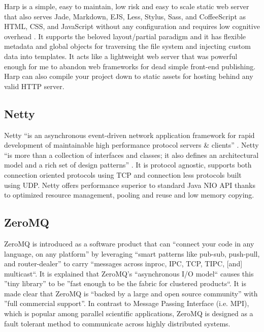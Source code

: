      Harp is a simple, easy to maintain, low risk and
     easy to scale static web server that also serves Jade, Markdown,
     EJS, Less, Stylus, Sass, and CoffeeScript as HTML, CSS, and
     JavaScript without any configuration and requires low cognitive
     overhead \cite{www-harp}. It supports the beloved layout/partial paradigm and it
     has flexible metadata and global objects for traversing the file
     system and injecting custom data into templates. It acts like a
     lightweight web server that was powerful enough for me to abandon
     web frameworks for dead simple front-end publishing. Harp can
     also compile your project down to static assets for hosting
     behind any valid HTTP server.

     \pv
     
\subsection{Netty}

     Netty ``is an asynchronous event-driven network
     application framework for rapid development of maintainable high
     performance protocol servers \& clients'' \cite{www-netty}. Netty
     ``is more than a collection of interfaces and classes; it also
     defines an architectural model and a rich set of design
     patterns'' \cite{netty-book}. It is protocol agnostic, supports both connection
     oriented protocols using TCP and connection less protocols built
     using UDP. Netty offers performance superior to standard Java NIO
     API thanks to optimized resource management, pooling and reuse
     and low memory copying.

     \pv
     
\subsection{ZeroMQ}

     ZeroMQ is introduced as a software product
     that can ``connect your code in any language, on any platform'' by 
     leveraging ``smart patterns like pub-sub, push-pull, and 
     router-dealer'' to carry ``messages across inproc, IPC, TCP, TIPC, 
     [and] multicast``\cite{www-zeromq}. It is explained that
     ZeroMQ's ``asynchronous I/O model`` causes this ''tiny library'' to 
     be ''fast enough to be the fabric for clustered products``\cite{www-zeromq2}.
     It is made clear that ZeroMQ is ``backed by a
     large and open source community'' with ''full commercial
     support''\cite{www-zeromq}.
     In contrast to Message Passing Interface (i.e. MPI), which is 
     popular among parallel scientific applications, ZeroMQ is 
     designed as a fault tolerant method to communicate across highly 
     distributed systems.

